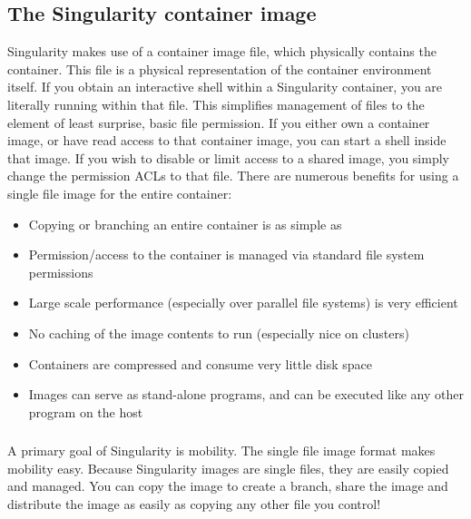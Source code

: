 \documentclass[letterpaper,10pt,english]{sphinxmanual}
\begin{document}
\subsection{The Singularity container image}
\label{\detokenize{introduction:the-singularity-container-image}}
Singularity makes use of a container image
file, which physically contains the container. This file is a physical
representation of the container environment itself. If you obtain an
interactive shell within a Singularity container, you are literally
running within that file.
This simplifies management of files to the element of least surprise,
basic file permission. If you either own a container image, or have
read access to that container image, you can start a shell inside that
image. If you wish to disable or limit access to a shared image, you
simply change the permission ACLs to that file.
There are numerous benefits for using a single file image for the
entire container:
\begin{itemize}
\item {} 
Copying or branching an entire container is as simple as 

\item {} 
Permission/access to the container is managed via standard file
system permissions

\item {} 
Large scale performance (especially over parallel file systems) is
very efficient

\item {} 
No caching of the image contents to run (especially nice on clusters)

\item {} 
Containers are compressed and consume very little disk space

\item {} 
Images can serve as stand-alone programs, and can be executed like
any other program on the host

\end{itemize}


\subsubsection{}
\label{\detokenize{introduction:copying-sharing-branching-and-distributing-your-image}}
A primary goal of Singularity is mobility. The single file image
format makes mobility easy. Because Singularity images are single
files, they are easily copied and managed. You can copy the image to
create a branch, share the image and distribute the image as easily as
copying any other file you control!
\end{document}
